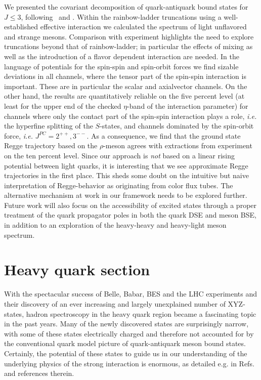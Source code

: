 We presented the covariant decomposition of quark-antiquark bound states for $J\le3$, 
following~\cite{Joos:1962qq,Weinberg:1964cn} and \cite{Zemach:1968zz}. Within the 
rainbow-ladder truncations using a well-established effective interaction we calculated 
the spectrum of light unflavored and strange mesons. Comparison with experiment highlights 
the need to explore truncations beyond that of rainbow-ladder; in particular the effects 
of mixing as well as the introduction of a flavor dependent interaction are needed.
In the language of potentials for the spin-spin and spin-orbit forces we find 
sizable deviations in all channels, where the tensor part of the spin-spin interaction is important.
These are in particular the scalar and axialvector channels. On the other hand, the results
are quantitatively reliable on the five percent level (at least for the upper end of the 
checked $\eta$-band of the interaction parameter) for channels where only the contact part
of the spin-spin interaction plays a role, {\it i.e.} the hyperfine splitting of the
$S$-states, and channels dominated by the spin-orbit force, {\it i.e.} $J^{PC}= 2^{++}, 3^{--}$.
As a consequence, we find that the ground state Regge trajectory based on the $\rho$-meson
agrees with extractions from experiment on the ten percent level. Since our approach is
{\it not} based on a linear rising potential between light quarks, it is interesting that 
we see approximate Regge trajectories in the first place. This sheds some doubt on the
intuitive but naive interpretation of Regge-behavior as originating from color flux tubes.
The alternative mechanism at work in our framework needs to be explored further. 
Future work will also focus on the accessibility of excited states through a proper
treatment of the quark propagator poles in both the quark DSE and meson BSE, in 
addition to an exploration of the heavy-heavy and heavy-light meson spectrum.

\section{Heavy quark section}
With the spectacular success of Belle, Babar, BES and the LHC 
experiments and their discovery of an ever increasing and
largely unexplained number of XYZ-states, hadron spectroscopy 
in the heavy quark region became a fascinating topic in the 
past years. Many of the newly discovered states are surprisingly 
narrow, with some of these states electrically charged and
therefore not accounted for by the conventional quark model picture 
of quark-antiquark meson bound states.
Certainly, the potential of these states to guide us in our
understanding of the underlying physics of the strong interaction
is enormous, as detailed e.g. in Refs.~\cite{Brambilla:2010cs,
Pakhlova:2010zza,JohanMesschendorpfortheBESIII:2013vla,Bodwin:2013nua} 
and references therein.

